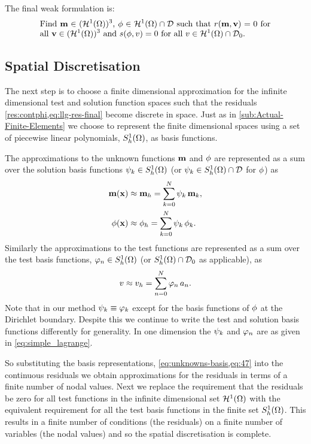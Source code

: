 {The final weak formulation is:
\begin{equation}
  \eqpar{Find $\mv \in (\tsinf)^3$, $\phim \in \tsinf \cap \Dfs$ such that $\rllg(\mv, \testv) = 0$ for all $\testv \in (\tsinf)^3$ and $\rphi(\phim, \test) = 0$ for all $\test \in \tsinf \cap \Dfs_0$.}
\label{eq:inf-dim-problem}
\end{equation}




\subsection{Spatial Discretisation}
\label{sec:spat-discr-resi}

The next step is to choose a finite dimensional approximation for the infinite dimensional test and solution function spaces such that the residuals \cref{res:contphi,eq:llg-res-final} become discrete in space.
Just as in \cref{sub:Actual-Finite-Elements} we choose to represent the finite dimensional spaces using a set of piecewise linear polynomials, ${S_h^1(\Omega)}$, as basis functions.

The approximations to the unknown functions $\boldsymbol{\mathrm{m}}$ and $\phi$ are represented as a sum over the solution basis functions ${\psi_k} \in {S_h^1(\Omega)}$ (or ${\psi_k} \in {S_h^1(\Omega)} \cap \mathcal{D}$ for $\phi$) as
\begin{equation}
  \begin{aligned}
    \boldsymbol{\mathrm{m}}(\boldsymbol{\mathrm{x}}) &\approx \boldsymbol{\mathrm{m}}_h = \sum_{k = 0}^{N} {\psi_k} \, \boldsymbol{\mathrm{m}}_k, \\
    \phi(\boldsymbol{\mathrm{x}}) &\approx {\phi}_h = \sum_{k = 0}^{N} {\psi_k} \, \phi_{k}.
    \label{eq:unknowns-basis}
  \end{aligned}
\end{equation}
Similarly the approximations to the test functions are represented as a sum over the test basis functions, ${\varphi_n} \in {S_h^1(\Omega)}$ (or ${S_h^1(\Omega)} \cap \mathcal{D}_0$ as applicable), as
\begin{equation}
  \label{eq:47}
  v \approx v_h = \sum_{n = 0}^{N} {\varphi_n} \, a_n.
\end{equation}
Note that in our method $\psi_k \equiv \varphi_k$ except for the basis functions of  $\phi$ at the Dirichlet boundary.
Despite this we continue to write the test and solution basis functions differently for generality.
In one dimension the ${\psi_k}$ and ${\varphi_n}$ are as given in \cref{eq:simple_lagrange}.

So substituting the basis representations, \cref{eq:unknowns-basis,eq:47} into the continuous residuals we obtain approximations for the residuals in terms of a finite number of nodal values.
Next we replace the requirement that the residuals be zero for all test functions in the infinite dimensional set ${\mathcal{H}^1(\Omega)}$ with the equivalent requirement for all the test basis functions in the finite set ${S_h^1(\Omega)}$.
This results in a finite number of conditions (the residuals) on a finite number of variables (the nodal values) and so the spatial discretisation is complete.

}
